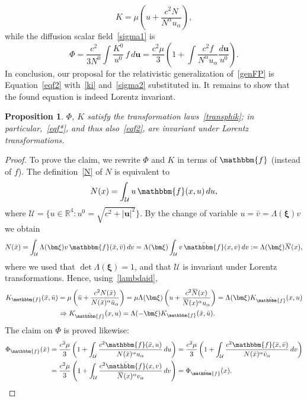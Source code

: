\documentclass[12pt]{article}
\newcommand{\R}{\mathbb{R}}
\newcommand{\overbar}[1]{\mkern 1.5mu\overline{\mkern-1.5mu#1\mkern-1.5mu}\mkern 1.5mu}
\newtheorem{proposition}{Proposition}
\theoremstyle{definition}
\numberwithin{equation}{section}
\begin{document}
\[
K=\mu\left(u+\frac{c^2N}{N^\alpha u_\alpha}\right),
\]
while the diffusion scalar field~\eqref{sigma1} is
\begin{equation}\label{sigma2}
\Phi=\frac{c^2}{3N^0}\int \frac{K^0}{u^0}\,f\,d{\bm u}=\frac{c^2\mu}{3}\left(1+\int \frac{c^2f}{N^\alpha u_\alpha}\frac{d{\bm u}}{u^0}\right).
\end{equation}
In conclusion, our proposal for the relativistic generalization of~\eqref{genFP} is Equation~\eqref{eqf2} with~\eqref{ki} and~\eqref{sigma2} substituted in. It remains to show that the found equation is indeed Lorentz invariant.
\begin{proposition}\label{inv4dprop}
$\Phi$, $K$ satisfy the transformation laws~\eqref{transphik}; in particular,~\eqref{eqf*}, and thus also~\eqref{eqf2}, are invariant under Lorentz transformations.
\end{proposition}
\begin{proof}
To prove the claim, we rewrite $\Phi$ and $K$ in terms of $\mathbbm{f}$ (instead of $f$). The definition~\eqref{N} of $N$ is equivalent to 
\[
N(x)=\int_\mathcal{U} u\,\mathbbm{f}(x, u)\,du,
\]
where $\mathcal{U}=\{u\in \R^4:u^0=\sqrt{c^2+|{\bm u}|^2}\}$. By the change of variable $u=\bar{v}=\Lambda({\bm\xi}) v$ we obtain
\[
N(\bar{x})=\int_\mathcal{U} \Lambda({\bm\xi}) v\,\mathbbm{f}(\bar{x}, \bar{v})\,dv=\Lambda({\bm\xi})\int_\mathcal{U} v\,\bar{\mathbbm{f}}(x,v)\,dv:=\Lambda({\bm\xi}) \overbar{N}(x),
\] 
where we used that $\det\Lambda({\bm\xi})=1$, and that $\mathcal{U}$ is invariant under Lorentz transformations.
Hence, using~\eqref{lambdaid},
\begin{align*}
K_\mathbbm{f} (\bar{x},\bar{u})&=\mu \left(\bar{u}+\frac{c^2N(\bar{x})}{N(\bar{x})^\alpha \bar{u}_\alpha}\right)=\mu\Lambda({\bm\xi})\left(u+\frac{c^2\overbar{N}(x)}{\overbar{N}(x)^\alpha u_\alpha}\right)=\Lambda({\bm\xi})K_{\bar{\mathbbm{f}}}(x,u)\\
&\Rightarrow K_{\bar{\mathbbm{f}}}(x,u)=\Lambda(-{\bm \xi})K_\mathbbm{f} (\bar{x},\bar{u}).
\end{align*}
The claim on $\Phi$ is proved likewise:
\begin{align*}
\Phi_\mathbbm{f} (\bar{x})&=\frac{c^2\mu}{3}\left(1+\int_\mathcal{U} \frac{c^2\mathbbm{f}(\bar{x},u)}{N(\bar{x})^\alpha u_\alpha}\,du\right)=\frac{c^2\mu}{3}\left(1+\int_\mathcal{U} \frac{c^2\mathbbm{f}(\bar{x},\bar{v})}{N(\bar{x})^\alpha \bar{v}_\alpha}\,d v\right)\\
&=\frac{c^2\mu}{3}\left(1+\int_\mathcal{U} \frac{c^2\bar{\mathbbm{f}}(x,v)}{\overbar{N}(x)^\alpha v_\alpha}\,dv\right)=\Phi_{\bar{\mathbbm{f}}}(x).
\end{align*}
\end{proof}
\end{document}
